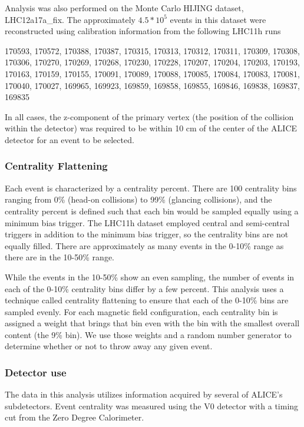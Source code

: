 Analysis was also performed on the Monte Carlo HIJING dataset, LHC12a17a\_fix.
The approximately $4.5*10^5$ events in this dataset were reconstructed using calibration information from the following LHC11h runs

170593, 170572, 170388, 170387, 170315, 170313, 170312, 170311, 170309, 170308, 170306, 170270, 170269, 170268, 170230, 170228, 170207, 170204, 170203, 170193, 170163, 170159, 170155, 170091, 170089, 170088, 170085, 170084, 170083, 170081, 170040, 170027, 169965, 169923, 169859, 169858, 169855, 169846, 169838, 169837, 169835

In all cases, the z-component of the primary vertex (the position of the collision within the detector) was required to be within 10 cm of the center of the ALICE detector for an event to be selected.  

\subsubsection{Centrality Flattening}
\label{sec:CentralityFlattening}

Each event is characterized by a centrality percent.
There are 100 centrality bins ranging from 0\%  (head-on collisions) to 99\% (glancing collisions), and the centrality percent is defined such that each bin would be sampled equally using a minimum bias trigger.
The LHC11h dataset employed central and semi-central triggers in addition to the minimum bias trigger, so the centrality bins are not equally filled.
There are approximately as many events in the 0-10\% range as there are in the 10-50\% range.

While the events in the 10-50\% show an even sampling, the number of events in each of the 0-10\% centrality bins differ by a few percent.
This analysis uses a technique called centrality flattening to ensure that each of the 0-10\% bins are sampled evenly.
For each magnetic field configuration, each centrality bin is assigned a weight that brings that bin even with the bin with the smallest overall content (the 9\% bin).
We use those weights and a random number generator to determine whether or not to throw away any given event.

\subsubsection{Detector use}
The data in this analysis utilizes information acquired by several of ALICE's subdetectors.  
Event centrality was measured using the V0 detector with a timing cut from the Zero Degree Calorimeter. 

